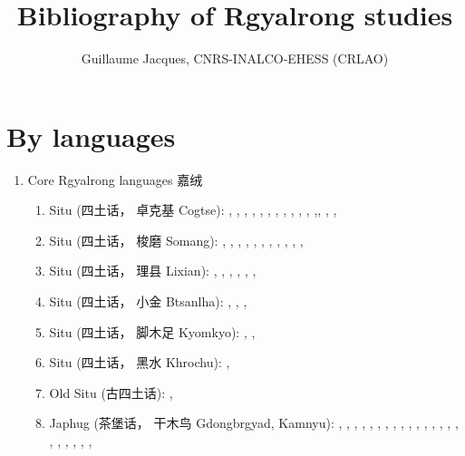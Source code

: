 \documentclass[oldfontcommands,oneside,a4paper,11pt]{article}
\newcommand{\zh}[1]{{\cn #1}}
\newcommand{\langue}[2]{#1}
\begin{document}
  \title{\langue{Bibliography of Rgyalrong studies}{Bibliographie des études rgyalrong}}
 
\author{Guillaume Jacques, CNRS-INALCO-EHESS (CRLAO)}
\maketitle
\sloppy
 
 
\section{\langue{By languages}{Publications classées par langue étudiée}}
\begin{enumerate}
\item \langue{Core Rgyalrong languages \zh{嘉绒}}{Rgyalrong \zh{嘉绒}}
\begin{enumerate}
\item Situ (\zh{四土话， 卓克基} Cogtse): \citet{lin83gouci}, \citet{nagano84}, \citet{linxr93jiarong}, \citet{huang93ka}, \citet{hsieh99zhuokeji}, \citet{wei01ka}, \citet{lin02dimension}, \citet{huangsun02}, \citet{youjing03zhuokeji}, \citet{nagano03cogtse}, \citet{jacques03s.houzhui}, \citet{jacksonlin07},\citet{lin09phd}, \citet{lin11direction},  \citet{jacques12agreement}, \citet{gates12situ}
\item Situ (\zh{四土话， 梭磨} Somang): \citet{jin57suomo}, \citet{jin58suomo}, \citet{bauman75}, \citet{delancey81ergativity},  \citet{delancey81direction}, \citet{qu83rencheng}, \citet{dai92suomo}, \citet{linxr93jiarong}, \citet{yanmuchu05houzhui}, \citet{yanmuchu05sa}, \citet{yanmuchu06hechengci}, 
\item Situ (\zh{四土话， 理县} Lixian): \citet{wolfenden36jyarung}, \citet{wen40paslok}, \citet{jin49jyarung}, \citet{chang68gyarung}, \citet{chang75gyarung}, \citet{linxr93jiarong},
\item Situ (\zh{四土话， 小金} Btsanlha): \citet{mansier83tsenla}, \citet{linxr93jiarong}, \citet{btsanlha09dict}, \citet{gates12situ}
\item Situ (\zh{四土话， 脚木足} Kyomkyo): \citet{linxr93jiarong}, \citet{prins11kyomkyo}, \citet{gates12situ}
\item Situ (\zh{四土话， 黑水} Khrochu): \citet{jackson15sastod},
\item \langue{Old Situ}{Ancien situ} (\zh{古四土话}): \citet{ngagdbang10gtamdpe},
\item Japhug (\zh{茶堡话， 干木鸟} Gdongbrgyad, Kamnyu):  \citet{jacques04redupl},     \citet{jacques04these},   \citet{jacques07passif},  \citet{jacques07redupl}, \citet{jacques08},  \citet{jacques10gesar}, \citet{jacques10refl},  \citet{jacques10inverse},  \citet{jacques12incorp},   \citet{jacques12demotion}, \citet{jacques11kinship}, \citet{jacques12agreement},  \citet{jacques13harmonization},  \citet{jacques13tropative}, \citet{jacques14antipassive}, \citet{japhug14ideophones}, \citet{jacques14inverse}, \citet{jacques14linking}, \citet{jacques14esquisse}, \citet{jacques15spontaneous}, \citet{jacques2012rgy}, \citet{jacques15causative}, 

\end{enumerate}
\end{enumerate}
\end{document}
